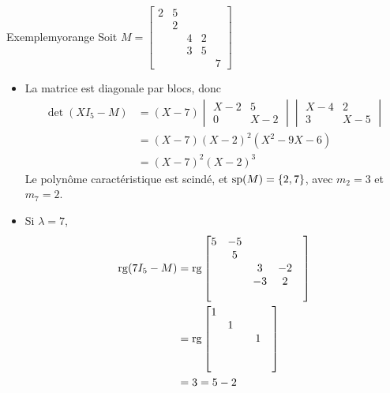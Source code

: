     \begin{omed}{Exemple}{myorange}
        Soit $M = \begin{bmatrix}
            2 & 5 & & & \\
            & 2 & & & \\
            & & 4 & 2 & \\
            & & 3 & 5 & \\
            & & & & 7 
        \end{bmatrix}$
        \begin{itemize}
            \item La matrice est diagonale par blocs, donc 
            \begin{align*}
                \det(X I_5 - M) 
                &= (X - 7) \begin{vmatrix}
                    X - 2 & 5 \\
                    0 & X - 2 
                \end{vmatrix} \begin{vmatrix}
                    X- 4 & 2 \\
                    3 & X - 5
                \end{vmatrix} \\
                &= (X - 7) (X - 2)^2 (X^2 - 9 X - 6) \\
                &= (X-7)^2 (X-2)^3
            \end{align*}
            Le polynôme caractéristique est scindé, et $\sp(M) = \left\{2,7\right\}$, avec $m_2 = 3$ et $m_7 = 2$.
            \item Si $\lambda = 7$,
            \begin{align*}
                \rg(7 I_5 - M )
                &= \rg\begin{bmatrix}
                    5 & -5 & & & \\
                     & 5 & & & \\
                    & & 3 & -2 & \\
                    & & -3 & 2 & \\
                    & & & & 
                \end{bmatrix} \\
                &= \rg\begin{bmatrix}
                    1 &  & & & \\
                     & 1 & & & \\
                    & &  & 1 & \\
                    & &  &  & \\
                    & & & & 
                \end{bmatrix} \\
                &= 3 = 5 - 2
            \end{align*}
            

\end{itemize}
\end{omed}
